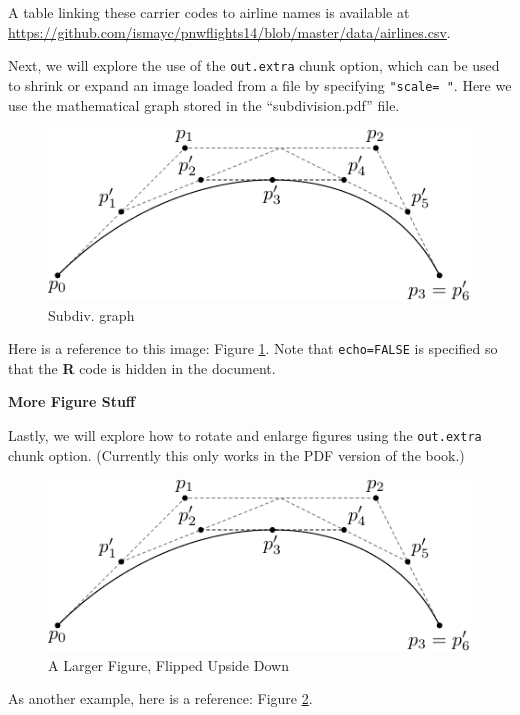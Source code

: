 \documentclass[12pt, twoside]{amherstthesis}
\begin{document}
A table linking these carrier codes to airline names is available at \url{https://github.com/ismayc/pnwflights14/blob/master/data/airlines.csv}.

\clearpage

Next, we will explore the use of the \texttt{out.extra} chunk option, which can be used to shrink or expand an image loaded from a file by specifying \texttt{"scale=\ "}. Here we use the mathematical graph stored in the ``subdivision.pdf'' file.
\begin{figure}

{\centering \includegraphics[scale=0.75]{figures/subdivision} 

}

\caption{Subdiv. graph}\label{fig:subd}
\end{figure}
Here is a reference to this image: Figure \ref{fig:subd}. Note that \texttt{echo=FALSE} is specified so that the \textbf{R} code is hidden in the document.

\textbf{More Figure Stuff}

Lastly, we will explore how to rotate and enlarge figures using the \texttt{out.extra} chunk option. (Currently this only works in the PDF version of the book.)
\begin{figure}

{\centering \includegraphics[angle=180, scale=1.1]{figures/subdivision} 

}

\caption{A Larger Figure, Flipped Upside Down}\label{fig:subd2}
\end{figure}
As another example, here is a reference: Figure \ref{fig:subd2}.
\end{document}
